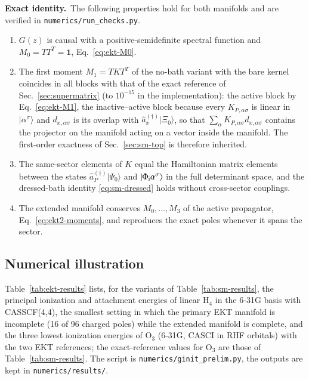 \documentclass[aip,jcp,reprint,noshowkeys,superscriptaddress]{revtex4-1}
\newcommand{\Exact}{\textbf{Exact identity.}\ }
\begin{document}
\Exact The following properties hold for both manifolds and are verified
in \texttt{numerics/run\_checks.py}.
\begin{enumerate}
\item $G(z)$ is causal with a positive-semidefinite spectral function and
  $M_0=TT^{T}=\mathbf 1$, Eq.~\eqref{eq:ekt-M0}.
\item The first moment $M_1=TKT^{T}$ of the no-bath variant with the bare
  kernel coincides in all blocks with that of the exact reference of
  Sec.~\ref{sec:supermatrix} (to $10^{-15}$ in the implementation): the
  active block by Eq.~\eqref{eq:ekt-M1}, the inactive--active block because
  every $K_{P,\alpha\sigma}$ is linear in $|\alpha^{\sigma}\rangle$ and
  $d_{x,\alpha\sigma}$ is its overlap with $\hat a_x^{(\dagger)}|\Xi_0\rangle$,
  so that $\sum_\alpha K_{P,\alpha\sigma}d_{x,\alpha\sigma}$ contains the
  projector on the manifold acting on a vector inside the manifold.  The
  first-order exactness of Sec.~\ref{sec:sm-top} is therefore inherited.
\item The same-sector elements of $K$ equal the Hamiltonian matrix elements
  between the states $\hat a_P^{(\dagger)}|\Psi_0\rangle$ and
  $|\Phi_{\rm i}\alpha^{\sigma}\rangle$ in the full determinant space, and
  the dressed-bath identity \eqref{eq:sm-dressed} holds without
  cross-sector couplings.
\item The extended manifold conserves $M_0,\ldots,M_3$ of the active
  propagator, Eq.~\eqref{eq:ekt2-moments}, and reproduces the exact poles
  whenever it spans the sector.
\end{enumerate}

\subsection{Numerical illustration}
\label{sec:ekt-numerics}

Table~\ref{tab:ekt-results} lists, for the variants of
Table~\ref{tab:sm-results}, the principal ionization and attachment
energies of linear H$_4$ in the 6-31G basis with CASSCF(4,4), the smallest
setting in which the primary EKT manifold is incomplete (16 of 96 charged
poles) while the extended manifold is complete, and the three lowest
ionization energies of O$_3$ (6-31G, CASCI in RHF orbitals) with the two
EKT references; the exact-reference values for O$_3$ are those of
Table~\ref{tab:sm-results}.  The script is
\texttt{numerics/ginit\_prelim.py}, the outputs are kept in
\texttt{numerics/results/}.
\end{document}
